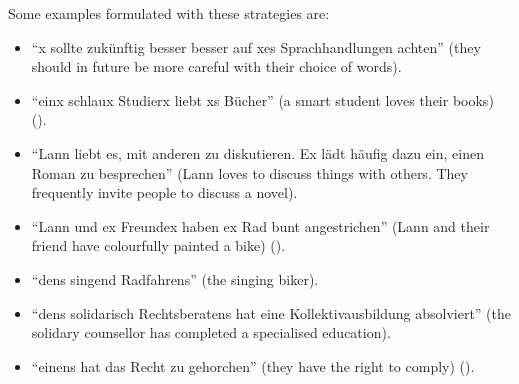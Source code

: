 \begin{table}[ht!]
    \caption[Selected strategies for gender-neutral German]{Selected strategies for gender-neutral German (\cite[294]{hornscheidt2012feministische}, \cite{sprachhandeln2015tun}, \cite[53]{hornscheidt2021wie})}
    \label{tab:genderneutrality_german}
\end{table}


Some examples formulated with these strategies are:
\begin{itemize}
\setlength\itemsep{-0.5em}
    \item ``x sollte zukünftig besser besser auf xes Sprachhandlungen achten'' (they should in future be more careful with their choice of words).
    \item ``einx schlaux Studierx liebt xs Bücher'' (a smart student loves their books) (\cite[294]{hornscheidt2012feministische}).
    \item ``Lann liebt es, mit anderen zu diskutieren. Ex lädt häufig dazu ein, einen Roman zu besprechen'' (Lann loves to discuss things with others. They frequently invite people to discuss a novel).
    \item ``Lann und ex Freundex haben ex Rad bunt angestrichen'' (Lann and their friend have colourfully painted a bike) (\cite{hornscheidtex}).
    \item ``dens singend Radfahrens'' (the singing biker).
    \item ``dens solidarisch Rechtsberatens hat eine Kollektivausbildung absolviert'' (the solidary counsellor has completed a specialised education).
    \item ``einens hat das Recht zu gehorchen'' (they have the right to comply) (\cite[55]{hornscheidt2021wie}).
\end{itemize}

